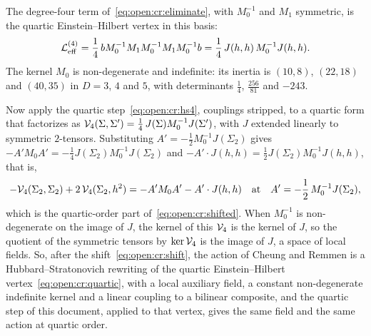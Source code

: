 The degree-four term of~\eqref{eq:open:cr:eliminate}, with $M_0^{-1}$ and $M_1$ symmetric, is the quartic Einstein--Hilbert vertex in this basis:
\begin{equation}
  \label{eq:open:cr:quartic}
  {\mathcal{L}}^{(4)}_{\rm eff}
    = \frac{1}{4} \, b M_0^{-1} M_1 M_0^{-1} M_1 M_0^{-1} b
    = \frac{1}{4} \, J(h, h) \, M_0^{-1} J(h, h).
\end{equation}
The kernel $M_0$ is non-degenerate and indefinite: its inertia is $(10, 8)$, $(22, 18)$ and $(40, 35)$ in $D = 3$, $4$ and $5$, with determinants $\tfrac{1}{4}$, $\tfrac{256}{81}$ and $- 243$.

Now apply the quartic step~\eqref{eq:open:cr:hs4}, couplings stripped, to a quartic form that factorizes as $\mathcal{V}_{4}(\Sigma, \Sigma') = \tfrac{1}{4} \, J(\Sigma) M_0^{-1} J(\Sigma')$, with $J$ extended linearly to symmetric $2$-tensors.
Substituting $A' = - \tfrac{1}{2} M_0^{-1} J(\Sigma_2)$ gives $- A' M_0 A' = - \tfrac{1}{4} J(\Sigma_2) M_0^{-1} J(\Sigma_2)$ and $- A' \cdot J(h, h) = \tfrac{1}{2} J(\Sigma_2) M_0^{-1} J(h, h)$, that is,
\begin{equation}
  \label{eq:open:cr:map}
  - \mathcal{V}_{4}(\Sigma_2, \Sigma_2)
  + 2 \, \mathcal{V}_{4}(\Sigma_2, h^2)
    = - A' M_0 A'
    - A' \cdot J(h, h)
  \quad
  \text{at}
  \quad
  A'
    = - \frac{1}{2} \, M_0^{-1} J(\Sigma_2),
\end{equation}
which is the quartic-order part of~\eqref{eq:open:cr:shifted}.
When $M_0^{-1}$ is non-degenerate on the image of $J$, the kernel of this $\mathcal{V}_{4}$ is the kernel of $J$, so the quotient of the symmetric tensors by $\ker \mathcal{V}_{4}$ is the image of $J$, a space of local fields.
So, after the shift~\eqref{eq:open:cr:shift}, the action of Cheung and Remmen is a Hubbard--Stratonovich rewriting of the quartic Einstein--Hilbert vertex~\eqref{eq:open:cr:quartic}, with a local auxiliary field, a constant non-degenerate indefinite kernel and a linear coupling to a bilinear composite, and the quartic step of this document, applied to that vertex, gives the same field and the same action at quartic order.


